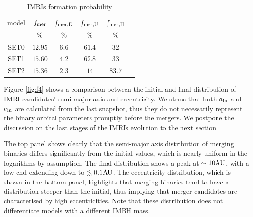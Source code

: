 \documentclass[twocolumn]{aastex62}
\newcommand{\au}{{\rm AU}}
\newcommand{\inn}{{\rm in}}
\begin{document}
\begin{table}
    \centering
    \caption{IMRIs formation probability}
    \begin{tabular}{cccccc}
        \hline
        \hline 
        model& $f_{\rm mer}$ & $f_{\rm mer,D}$ & $f_{\rm mer,U}$ & $f_{\rm mer,H}$\\
             & $\%$& $\%$& $\%$& $\%$\\
        \hline
		SET0 & $12.95$ & $6.6$ & $61.4$ & $32$ \\
		SET1 & $15.60$ & $4.2$ & $62.8$ & $33$ \\
		SET2 & $15.36$ & $2.3$ & $14$   & $83.7$ \\
        \hline
    \end{tabular}
    \label{tab:t3}
\end{table}


Figure \ref{fig:f4} shows a comparison between the initial and final distribution of IMRI candidates' semi-major axis and eccentricity. We stress that both $a_\inn$ and $e_\inn$ are calculated from the last snapshot, thus they do not necessarily represent the binary orbital parameters promptly before the mergers. We postpone the discussion on the last stages of the IMRIs evolution to the next section.

The top panel shows clearly that the semi-major axis distribution of merging binaries differs significantly from the initial values, which is nearly uniform in the logarithms by assumption. The final distribution shows a peak at $\sim 10\au$, with a low-end extending down to $\lesssim 0.1 \au$. The eccentricity distribution, which is shown in the bottom panel, highlights that merging binaries tend to have a distribution steeper than the initial, thus implying that merger candidates are characterised by high eccentricities. Note that these distribution does not differentiate models with a different IMBH mass. 
\end{document}
